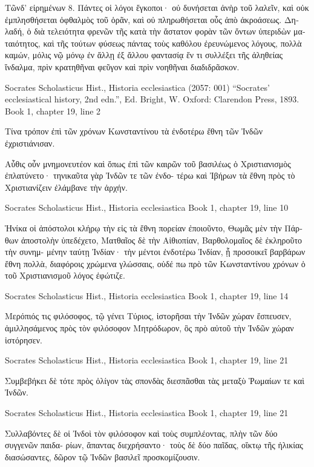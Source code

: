 \documentclass[12pt,letterpaper,twoside,final]{memoir}
\begin{document}
\begin{greek}
                                            Τῶνδ' εἰρημένων 
 8. Πάντες οἱ λόγοι ἔγκοποι· οὐ δυνήσεται ἀνὴρ τοῦ 
λαλεῖν, καὶ οὐκ ἐμπλησθήσεται ὀφθαλμὸς τοῦ ὁρᾶν, καὶ οὐ 
πληρωθήσεται οὗς ἀπὸ ἀκροάσεως. 
 Δηλαδή, ὁ διὰ τελειότητα φρενῶν τῆς κατὰ τὴν ἄστατον 
φορὰν τῶν ὄντων ὑπεριδὼν ματαιότητος, καὶ τῆς τούτων 
φύσεως πάντας τοὺς καθόλου ἐρευνώμενος λόγους, πολλὰ 
καμών, μόλις νῷ μόνῳ ἐν ἄλλῃ ἐξ ἄλλου φαντασίᾳ ἕν τι 
συλλέξει τῆς ἀληθείας ἴνδαλμα, πρὶν κρατηθῆναι φεῦγον καὶ 
πρὶν νοηθῆναι διαδιδρᾶσκον. 

Socrates Scholasticus Hist., Historia ecclesiastica (2057: 001)
“Socrates' ecclesiastical history, 2nd edn.”, Ed. Bright, W.
Oxford: Clarendon Press, 1893.
Book 1, chapter 19, line 2

Τίνα τρόπον ἐπὶ τῶν χρόνων Κωνσταντίνου τὰ ἐνδοτέρω ἔθνη τῶν 
Ἰνδῶν ἐχριστιάνισαν.


 Αὖθις οὖν μνημονευτέον καὶ ὅπως ἐπὶ τῶν καιρῶν τοῦ βασιλέως 
ὁ Χριστιανισμὸς ἐπλατύνετο· τηνικαῦτα γὰρ Ἰνδῶν τε τῶν ἐνδο-
τέρω καὶ Ἰβήρων τὰ ἔθνη πρὸς τὸ Χριστιανίζειν ἐλάμβανε τὴν 
ἀρχήν. 



Socrates Scholasticus Hist., Historia ecclesiastica 
Book 1, chapter 19, line 10

                     Ἡνίκα οἱ ἀπόστολοι κλήρῳ τὴν εἰς τὰ ἔθνη 
πορείαν ἐποιοῦντο, Θωμᾶς μὲν τὴν Πάρθων ἀποστολὴν ὑπεδέχετο, 
Ματθαῖος δὲ τὴν Αἰθιοπίαν, Βαρθολομαῖος δὲ ἐκληροῦτο τὴν συνημ-
μένην ταύτῃ Ἰνδίαν· τὴν μέντοι ἐνδοτέρω Ἰνδίαν, ᾗ προσοικεῖ 
βαρβάρων ἔθνη πολλὰ, διαφόροις χρώμενα γλώσσαις, οὐδέ πω 
πρὸ τῶν Κωνσταντίνου χρόνων ὁ τοῦ Χριστιανισμοῦ λόγος ἐφώτιζε. 



Socrates Scholasticus Hist., Historia ecclesiastica 
Book 1, chapter 19, line 14

Μερόπιός τις φιλόσοφος, τῷ γένει Τύριος, ἱστορῆσαι τὴν Ἰνδῶν 
χώραν ἔσπευσεν, ἁμιλλησάμενος πρὸς τὸν φιλόσοφον Μητρόδωρον, 
ὃς πρὸ αὐτοῦ τὴν Ἰνδῶν χώραν ἱστόρησεν. 



Socrates Scholasticus Hist., Historia ecclesiastica 
Book 1, chapter 19, line 21

Συμβεβήκει δὲ τότε πρὸς ὀλίγον τὰς σπονδὰς διεσπᾶσθαι τὰς 
μεταξὺ Ῥωμαίων τε καὶ Ἰνδῶν. 



Socrates Scholasticus Hist., Historia ecclesiastica 
Book 1, chapter 19, line 21

                                     Συλλαβόντες δὲ οἱ Ἰνδοὶ τὸν 
φιλόσοφον καὶ τοὺς συμπλέοντας, πλὴν τῶν δύο συγγενῶν παιδα-
ρίων, ἅπαντας διεχρήσαντο· τοὺς δὲ δύο παῖδας, οἴκτῳ τῆς ἡλικίας 
διασώσαντες, δῶρον τῷ Ἰνδῶν βασιλεῖ προσκομίζουσιν. 




\end{greek}
\end{document}

